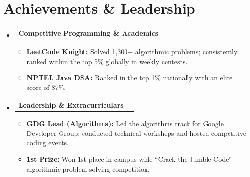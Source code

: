 \documentclass[letterpaper,10pt]{article}
\makeatletter
\newcommand{\resumeItem}[1]{
  \item\small{
    {#1 \vspace{-2pt}}
  }
}
\newcommand{\resumeProjectHeading}[2]{
    \item
    \begin{tabular*}{0.97\textwidth}{l@{\extracolsep{\fill}}r}
      \small#1 & #2 \\
    \end{tabular*}\vspace{-6pt}
}
\newcommand{\resumeSubHeadingListStart}{\begin{itemize}[leftmargin=0.15in, label={}]}
\newcommand{\resumeSubHeadingListEnd}{\end{itemize}}
\newcommand{\resumeItemListStart}{\begin{itemize}[leftmargin=0.15in]}
\newcommand{\resumeItemListEnd}{\end{itemize}\vspace{-4pt}}
\makeatother
\begin{document}
\section{Achievements \& Leadership}
  \resumeSubHeadingListStart
    \resumeProjectHeading
          {\textbf{Competitive Programming \& Academics}}{}
          \resumeItemListStart
            \resumeItem{\textbf{LeetCode Knight:} Solved 1,300+ algorithmic problems; consistently ranked within the top 5\% globally in weekly contests.}
            \resumeItem{\textbf{NPTEL Java DSA:} Ranked in the top 1\% nationally with an elite score of 87\%.}
          \resumeItemListEnd
    \resumeProjectHeading
          {\textbf{Leadership \& Extracurriculars}}{}
          \resumeItemListStart
            \resumeItem{\textbf{GDG Lead (Algorithms):} Led the algorithms track for Google Developer Group; conducted technical workshops and hosted competitive coding events.}
            \resumeItem{\textbf{1st Prize:} Won 1st place in campus-wide ``Crack the Jumble Code'' algorithmic problem-solving competition.}
          \resumeItemListEnd
  \resumeSubHeadingListEnd
\end{document}
